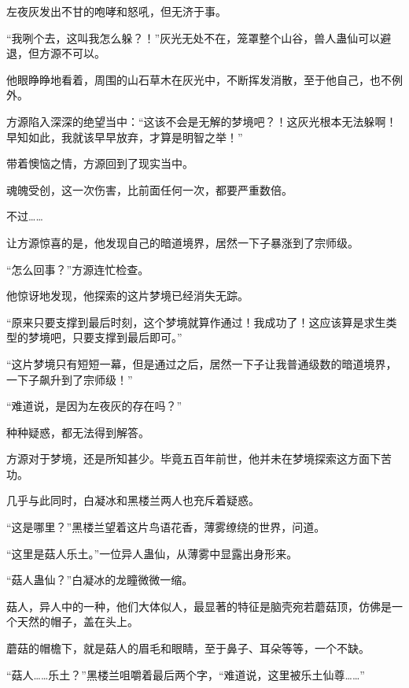 \begin{this_body}
左夜灰发出不甘的咆哮和怒吼，但无济于事。

“我咧个去，这叫我怎么躲？！”灰光无处不在，笼罩整个山谷，兽人蛊仙可以避退，但方源不可以。

他眼睁睁地看着，周围的山石草木在灰光中，不断挥发消散，至于他自己，也不例外。

方源陷入深深的绝望当中：“这该不会是无解的梦境吧？！这灰光根本无法躲啊！早知如此，我就该早早放弃，才算是明智之举！”

带着懊恼之情，方源回到了现实当中。

魂魄受创，这一次伤害，比前面任何一次，都要严重数倍。

不过……

让方源惊喜的是，他发现自己的暗道境界，居然一下子暴涨到了宗师级。

“怎么回事？”方源连忙检查。

他惊讶地发现，他探索的这片梦境已经消失无踪。

“原来只要支撑到最后时刻，这个梦境就算作通过！我成功了！这应该算是求生类型的梦境吧，只要支撑到最后即可。”

“这片梦境只有短短一幕，但是通过之后，居然一下子让我普通级数的暗道境界，一下子飙升到了宗师级！”

“难道说，是因为左夜灰的存在吗？”

种种疑惑，都无法得到解答。

方源对于梦境，还是所知甚少。毕竟五百年前世，他并未在梦境探索这方面下苦功。

几乎与此同时，白凝冰和黑楼兰两人也充斥着疑惑。

“这是哪里？”黑楼兰望着这片鸟语花香，薄雾缭绕的世界，问道。

“这里是菇人乐土。”一位异人蛊仙，从薄雾中显露出身形来。

“菇人蛊仙？”白凝冰的龙瞳微微一缩。

菇人，异人中的一种，他们大体似人，最显著的特征是脑壳宛若蘑菇顶，仿佛是一个天然的帽子，盖在头上。

蘑菇的帽檐下，就是菇人的眉毛和眼睛，至于鼻子、耳朵等等，一个不缺。

“菇人……乐土？”黑楼兰咀嚼着最后两个字，“难道说，这里被乐土仙尊……”

\end{this_body}

